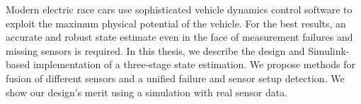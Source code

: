 Modern electric race cars use sophisticated vehicle dynamics control software to exploit the maximum physical potential of the vehicle. For the best results, an accurate and robust state estimate even in the face of measurement failures and missing sensors is required. In this thesis, we describe the design and Simulink-based implementation of a three-stage state estimation. We propose methods for fusion of different sensors and a unified failure and sensor setup detection. We show our design's merit using a simulation with real sensor data.

